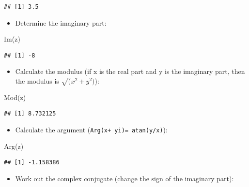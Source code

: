 \documentclass[
]{book}
\newenvironment{Shaded}{\begin{snugshade}}{\end{snugshade}}
\newcommand{\FunctionTok}[1]{\textcolor[rgb]{0.00,0.00,0.00}{#1}}
\newcommand{\NormalTok}[1]{#1}
\providecommand{\tightlist}{%
  \setlength{\itemsep}{0pt}\setlength{\parskip}{0pt}}
\theoremstyle{definition}
\theoremstyle{definition}
\theoremstyle{definition}
\theoremstyle{definition}
\theoremstyle{remark}
\begin{document}
\begin{verbatim}
## [1] 3.5
\end{verbatim}

\begin{itemize}
\tightlist
\item
  Determine the imaginary part:
\end{itemize}

\begin{Shaded}
\begin{Highlighting}[]
\FunctionTok{Im}\NormalTok{(z)}
\end{Highlighting}
\end{Shaded}

\begin{verbatim}
## [1] -8
\end{verbatim}

\begin{itemize}
\tightlist
\item
  Calculate the modulus (if x is the real part and y is the imaginary part, then the modulus is \(\sqrt(x^2 + y^2)\)):
\end{itemize}

\begin{Shaded}
\begin{Highlighting}[]
\FunctionTok{Mod}\NormalTok{(z)}
\end{Highlighting}
\end{Shaded}

\begin{verbatim}
## [1] 8.732125
\end{verbatim}

\begin{itemize}
\tightlist
\item
  Calculate the argument (\texttt{Arg(x+\ yi)=\ atan(y/x)}):
\end{itemize}

\begin{Shaded}
\begin{Highlighting}[]
\FunctionTok{Arg}\NormalTok{(z)}
\end{Highlighting}
\end{Shaded}

\begin{verbatim}
## [1] -1.158386
\end{verbatim}

\begin{itemize}
\tightlist
\item
  Work out the complex conjugate (change the sign of the imaginary part):
\end{itemize}
\end{document}
